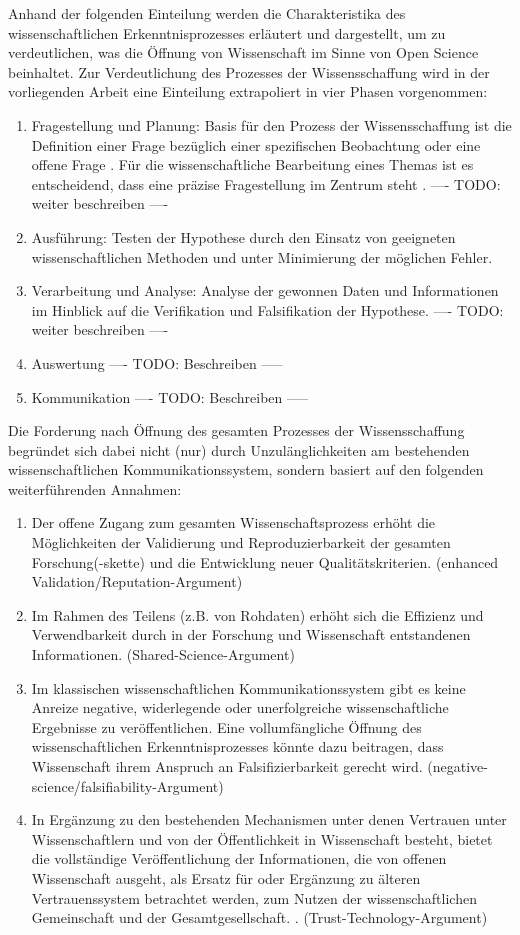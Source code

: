 Anhand der folgenden Einteilung werden die Charakteristika des wissenschaftlichen Erkenntnisprozesses erläutert und dargestellt, um zu verdeutlichen, was die Öffnung von Wissenschaft im Sinne von Open Science beinhaltet. Zur Verdeutlichung des Prozesses der Wissensschaffung wird in der vorliegenden Arbeit eine Einteilung extrapoliert in vier Phasen vorgenommen:
\begin{enumerate}
\item Fragestellung und Planung: Basis für den Prozess der Wissensschaffung ist die Definition einer Frage bezüglich einer spezifischen Beobachtung oder eine offene Frage \cite{suchen}. Für die wissenschaftliche Bearbeitung eines Themas ist es entscheidend, dass eine präzise Fragestellung im Zentrum steht \cite{suchen}. ---- TODO: weiter beschreiben ----
\item Ausführung: Testen der Hypothese durch den Einsatz von geeigneten wissenschaftlichen Methoden und unter Minimierung der möglichen Fehler.
\item Verarbeitung und Analyse: Analyse der gewonnen Daten und Informationen im Hinblick auf die Verifikation und Falsifikation der Hypothese. ---- TODO: weiter beschreiben ----
\item Auswertung ---- TODO: Beschreiben -----
\item Kommunikation ---- TODO: Beschreiben -----
\end{enumerate}

Die Forderung nach Öffnung des gesamten Prozesses der Wissensschaffung begründet sich dabei nicht (nur) durch Unzulänglichkeiten am bestehenden wissenschaftlichen Kommunikationssystem, sondern basiert auf den folgenden weiterführenden Annahmen:
\begin{enumerate}
\item Der offene Zugang zum gesamten Wissenschaftsprozess erhöht die Möglichkeiten der Validierung und Reproduzierbarkeit der gesamten Forschung(-skette) \cite{Krumholz_2014} und die Entwicklung neuer Qualitätskriterien. (enhanced Validation/Reputation-Argument)
\item Im Rahmen des Teilens (z.B. von Rohdaten) erhöht sich die Effizienz und Verwendbarkeit durch in der Forschung und Wissenschaft entstandenen Informationen. (Shared-Science-Argument)
\item Im klassischen wissenschaftlichen Kommunikationssystem gibt es keine Anreize negative, widerlegende oder unerfolgreiche wissenschaftliche Ergebnisse zu veröffentlichen. Eine vollumfängliche Öffnung des wissenschaftlichen Erkenntnisprozesses könnte dazu beitragen, dass Wissenschaft ihrem Anspruch an Falsifizierbarkeit gerecht wird. (negative-science/falsifiability-Argument)
\item In Ergänzung zu den bestehenden Mechanismen unter denen Vertrauen unter Wissenschaftlern und von der Öffentlichkeit in Wissenschaft besteht, bietet die vollständige Veröffentlichung der Informationen, die von offenen Wissenschaft ausgeht, als Ersatz für oder Ergänzung zu älteren Vertrauenssystem betrachtet werden, zum Nutzen der wissenschaftlichen Gemeinschaft und der Gesamtgesellschaft. \cite{grand_2012_open}.  (Trust-Technology-Argument)
\end{enumerate}

